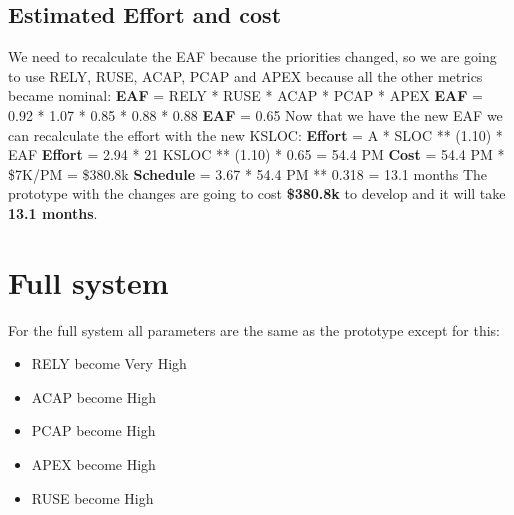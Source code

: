 \subsection{Estimated Effort and cost}
We need to recalculate the EAF because the priorities changed, so we are going to use RELY, RUSE, ACAP, PCAP and APEX because all the other metrics became nominal:\newline\newline
\textbf{EAF} = RELY * RUSE * ACAP * PCAP * APEX \newline
\textbf{EAF} = 0.92 * 1.07 * 0.85 * 0.88 * 0.88 \newline
\textbf{EAF} = 0.65\newline\newline
\noindent
Now that we have the new EAF we can recalculate the effort with the new KSLOC:\newline\newline
\textbf{Effort} = A * SLOC ** (1.10) * EAF \newline
\textbf{Effort} = 2.94 * 21 KSLOC ** (1.10) * 0.65 = 54.4 PM \newline\newline
\textbf{Cost} = 54.4 PM * \$7K/PM = \$380.8k\newline\newline
\textbf{Schedule} = 3.67 * 54.4 PM ** 0.318 = 13.1 months\newline\newline
\noindent
The prototype with the changes are going to cost \textbf{\$380.8k} to develop and it will take \textbf{13.1 months}.

\pagebreak

\section{Full system}
For the full system all parameters are the same as the prototype except for this:
\begin{itemize}
    \item RELY become Very High 
    \item ACAP become High
    \item PCAP become High 
    \item APEX become High 
    \item RUSE become High 
\end{itemize}
